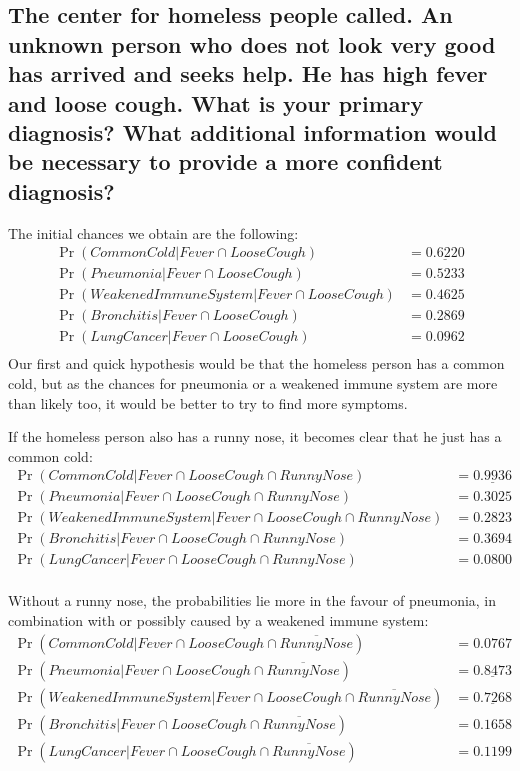 \documentclass[12pt, a4paper]{article}
\begin{document}
\subsection{The center for homeless people called. An unknown person who does not look very good has arrived and seeks help. He has high fever and loose cough. What is your primary diagnosis? What additional information would be necessary to provide a more confident diagnosis?}
The initial chances we obtain are the following:
\begin{align*}
\Pr(CommonCold | Fever \cap LooseCough) &= \underline{0.6220} \\
\Pr(Pneumonia | Fever \cap LooseCough) &= 0.5233 \\
\Pr(WeakenedImmuneSystem | Fever \cap LooseCough) &= 0.4625 \\
\Pr(Bronchitis | Fever \cap LooseCough) &= 0.2869 \\
\Pr(LungCancer | Fever \cap LooseCough) &= 0.0962 \\
\end{align*}
Our first and quick hypothesis would be that the homeless person has a common cold, but as the chances for pneumonia or a weakened immune system are more than likely too, it would be better to try to find more symptoms.

If the homeless person also has a runny nose, it becomes clear that he just has a common cold:
\begin{align*}
\Pr(CommonCold | Fever \cap LooseCough \cap RunnyNose) &= \underline{0.9936} \\
\Pr(Pneumonia | Fever \cap LooseCough \cap RunnyNose) &= 0.3025 \\
\Pr(WeakenedImmuneSystem | Fever \cap LooseCough \cap RunnyNose) &= 0.2823 \\
\Pr(Bronchitis | Fever \cap LooseCough \cap RunnyNose) &= 0.3694 \\
\Pr(LungCancer | Fever \cap LooseCough \cap RunnyNose) &= 0.0800 \\
\end{align*}

Without a runny nose, the probabilities lie more in the favour of pneumonia, in combination with or possibly caused by a weakened immune system:
\begin{align*}
\Pr(CommonCold | Fever \cap LooseCough \cap \overline{RunnyNose}) &= 0.0767 \\
\Pr(Pneumonia | Fever \cap LooseCough \cap \overline{RunnyNose}) &= \underline{0.8473} \\
\Pr(WeakenedImmuneSystem | Fever \cap LooseCough \cap \overline{RunnyNose}) &= \underline{0.7268} \\
\Pr(Bronchitis | Fever \cap LooseCough \cap \overline{RunnyNose}) &= 0.1658 \\
\Pr(LungCancer | Fever \cap LooseCough \cap \overline{RunnyNose}) &= 0.1199 \\
\end{align*}
\end{document}
